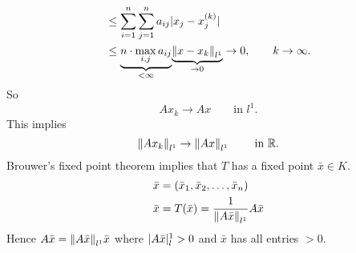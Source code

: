 \begin{beweis}
\begin{align*}
	&\leq  \sum^{n}_{i=1} \sum^{n}_{j=1} a_{ij} \abs{x_j-x_j^{(k)}} \\
	&\leq \underset{< \infty}{\underbrace{n \cdot \max\limits_{i,j} a_{ij}}} \underset{\to 0}{\underbrace{\norm{x-x_k}_{l^1}}} \to 0, \qquad k \to \infty.
\end{align*}
So \[
	Ax_k \to Ax \qquad \text{in }l^1.
\]
This implies
\[
	\norm{Ax_k}_{l^1} \to \norm{Ax}_{l^1} \qquad \text{ in }\mathbb{R}.
\]
Brouwer's fixed point theorem implies that $T$ has a fixed point $\bar{x} \in K$.
\begin{align*}
	\bar{x} &= (\bar{x}_1,\bar{x}_2,\dots,\bar{x}_n) \\
	\bar{x} &= T(\bar{x}) = \frac{1}{\norm{A \bar{x}}_{l^1}} A \bar{x} 
\end{align*}
Hence
$A \bar{x} = \norm{ A \bar{x}}_{l^1} \bar{x}$ where $\lvert A \bar{x}\rvert_l^1 >0$ and $\bar{x}$ has all entries $>0$.
\end{beweis}

